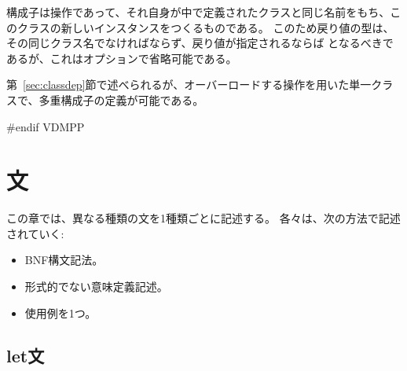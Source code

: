 \documentclass[\pformat,12pt]{jarticle}
\begin{document}
構成子は操作であって、それ自身が中で定義されたクラスと同じ名前をもち、このクラスの新しいインスタンスをつくるものである。
このため戻り値の型は、その同じクラス名でなければならず、戻り値が指定されるならば となるべきであるが、これはオプションで省略可能である。

第~\ref{sec:classdep}節で述べられるが、オーバーロードする操作を用いた単一クラスで、多重構成子の定義が可能である。 

#endif VDMPP

\section{文}\label{sec:stmt}

この章では、異なる種類の文を1種類ごとに記述する。 
各々は、次の方法で記述されていく:
\begin{itemize}
\item BNF構文記法。
\item 形式的でない意味定義記述。
\item 使用例を1つ。
\end{itemize}

\subsection{let文}\label{letstmt}
\end{document}
